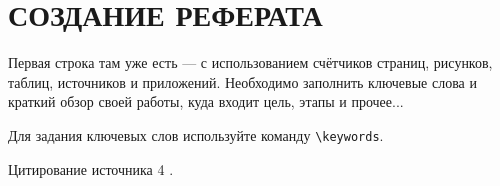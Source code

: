 \section{СОЗДАНИЕ РЕФЕРАТА}

Первая строка там уже есть --- с использованием счётчиков страниц, рисунков, 
таблиц, источников и приложений. 
Необходимо заполнить ключевые слова и краткий обзор своей работы, 
куда входит цель, этапы и прочее...

Для задания ключевых слов используйте команду \texttt{\textbackslash keywords}.

\lipsum[3-4]

Цитирование источника 4 \cite{Wikipedia4} \cite{cite_1_2} \cite{cite_1_15} \cite{cite_1_16}.
